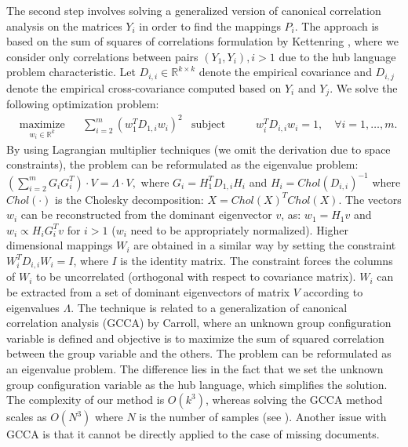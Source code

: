 \documentclass{article} %
\newcommand{\RR}{\mathbb{R}}
\begin{document}
The second step involves solving a generalized version of canonical correlation analysis on the matrices $Y_i$ in order to find the mappings $P_i$. The approach is based on the sum of squares of correlations formulation by Kettenring \cite{Kettenring}, where we consider only correlations between pairs $(Y_1, Y_i), i >1$ due to the hub language problem characteristic.
 Let $D_{i,i} \in \RR^{k \times k}$ denote the empirical covariance and $D_{i,j}$ denote the empirical cross-covariance computed based on $Y_i$ and $Y_j$. We solve the following optimization problem:
\begin{equation*}%
\begin{aligned}
& \underset{w_i \in \RR^{k}}{\text{maximize}}
& & \sum_{i = 2}^m  \left(w_1^T D_{1,i} w_i \right)^2
& \text{subject to}
& & w_i^T D_{i,i} w_i = 1, \quad\forall i = 1,\ldots, m.
\end{aligned}
\end{equation*}
By using Lagrangian multiplier techniques (we omit the derivation due to space constraints), the problem can be reformulated as the eigenvalue problem:$\left(\sum_{i=2}^m G_i G_i^T\right) \cdot V = \Lambda \cdot V,$
 where $G_i = H_1^T D_{1,i} H_i$ and $H_i = Chol(D_{i,i})^{-1}$ where $Chol(\cdot)$ is the Cholesky decomposition: $X = Chol(X)^T Chol(X)$. The vectors $w_i$ can be reconstructed from the dominant eigenvector $v$, as: $w_1 = H_1 v$  and $w_i \propto H_i  G_i^T  v$ for $i >1$ ($w_i$ need to be appropriately normalized). Higher dimensional mappings $W_i$ are obtained in a similar way by setting the constraint $W_i^T D_{i,i} W_i = I$, where $I$ is the identity matrix. The constraint forces the columns of $W_i$ to be uncorrelated (orthogonal with respect to covariance matrix). $W_i$ can be extracted from a set of dominant eigenvectors of matrix $V$ according to eigenvalues $\Lambda$.
The technique is related to a generalization of canonical correlation analysis (GCCA) by Carroll\cite{Carroll}, where an unknown group configuration variable is defined and objective is to maximize the sum of squared correlation between the group variable and the others. The problem can be reformulated as an eigenvalue problem. The difference lies in the fact that we set the unknown group configuration variable as the hub language, which simplifies the solution. The complexity of our method is $O(k^3)$, whereas solving the GCCA method scales as $O(N^3)$ where $N$ is the number of samples (see \cite{gifi}). Another issue with GCCA is that it cannot be directly applied to the case of missing documents.
\end{document}
